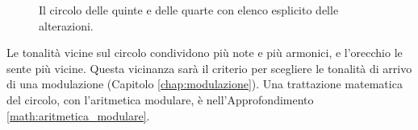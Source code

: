 \begin{figure}[H]
	\caption{Il circolo delle quinte e delle quarte con elenco esplicito delle alterazioni.}
	\label{fig:circolo_quinte_migliorato_compatto}
\end{figure}

Le tonalità vicine sul circolo condividono più note e più armonici, e l'orecchio le sente più vicine. Questa vicinanza sarà il criterio per scegliere le tonalità di arrivo di una modulazione (Capitolo \ref{chap:modulazione}). Una trattazione matematica del circolo, con l'aritmetica modulare, è nell'Approfondimento \ref{math:aritmetica_modulare}.
